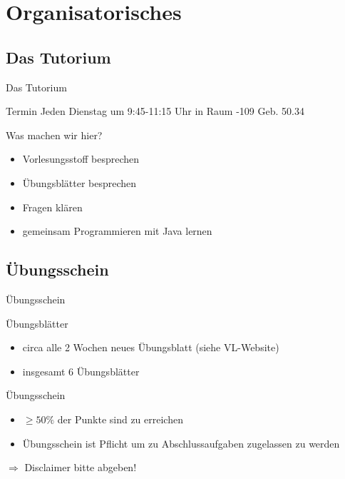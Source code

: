 \documentclass[18pt]{beamer}
\begin{document}
\section{Organisatorisches}
\subsection{Das Tutorium}
\begin{frame}{Das Tutorium}
\begin{block}{Termin}
	Jeden Dienstag um 9:45-11:15 Uhr in Raum -109 Geb. 50.34
\end{block}
\begin{block}{Was machen wir hier?}
	\begin{itemize}
		\item Vorlesungsstoff besprechen
		\item Übungsblätter besprechen
		\item Fragen klären
		\item gemeinsam Programmieren mit Java lernen
	\end{itemize}
\end{block}
\end{frame}

\subsection{Übungsschein}
\begin{frame}{Übungsschein}
	\begin{block}{Übungsblätter}
		\begin{itemize}
			\item circa alle 2 Wochen neues Übungsblatt (siehe VL-Website)
			\item insgesamt 6 Übungsblätter
		\end{itemize}
	\end{block}
	\pause
	\begin{block}{Übungsschein}
		\begin{itemize}
			\item $\geq 50\%$ der Punkte sind zu erreichen
			\item Übungsschein ist Pflicht um zu Abschlussaufgaben zugelassen zu werden
		\end{itemize}
	\end{block}
	\huge{$\Rightarrow$ Disclaimer bitte abgeben!}
\end{frame}
\end{document}
